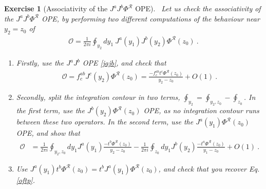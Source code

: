 \documentclass[12pt, a4paper, notitlepage, twoside]{report}
\numberwithin{equation}{section}
\theoremstyle{break}
\newtheorem{exo}{Exercise}[chapter]
\begin{document}
\begin{exo}[Associativity of the $J^aJ^b\Phi^\mathcal{R}$ OPE]
 ~\label{exojjp}
Let us check the associativity of the $J^aJ^b\Phi^\mathcal{R}$ OPE, by performing two different computations of the behaviour near $y_2=z_0$ of 
\begin{align}
\mathcal{O}= \frac{1}{2\pi i} \oint_{y_2}dy_1\ J^a(y_1)J^b(y_2)\Phi^\mathcal{R}(z_0)\ .
\end{align}
\begin{enumerate}
 \item 
Firstly, use the $J^aJ^b$ OPE \eqref{jajb}, and check that
\begin{align}
 \mathcal{O}= f_c^{ab}J^c(y_2)\Phi^\mathcal{R}(z_0) = \frac{-f_c^{ab}t^c\Phi^\mathcal{R}(z_0)}{y_2-z_0} + O(1)\ .
 \label{oftp}
\end{align}

\item
Secondly, split the integration contour in two terms, $\oint_{y_2} = \oint_{y_2,z_0} - \oint_{z_0}$.
In the first term, use the $J^b(y_2)\Phi^\mathcal{R}(z_0)$ OPE, as no integration contour runs between these two operators.
In the second term, use the $J^a(y_1)\Phi^\mathcal{R}(z_0)$ OPE, and show that
\begin{align}
 \mathcal{O}& =\frac{1}{2\pi i} \oint_{y_2,z_0}dy_1 J^a(y_1)\frac{-t^b\Phi^\mathcal{R}(z_0)}{y_2-z_0} - \frac{1}{2\pi i} \oint_{z_0}dy_1 J^b(y_2)\frac{-t^a\Phi^\mathcal{R}(z_0)}{y_1-z_0} +O(1)\ .
\end{align}

\item
Use $J^a(y_1) t^b \Phi^\mathcal{R}(z_0) =t^b J^a(y_1)  \Phi^\mathcal{R}(z_0)$, and check that you recover Eq. \eqref{oftp}.
\end{enumerate}
\end{exo}
\end{document}
